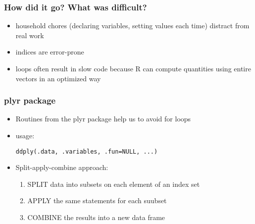 \documentclass{beamer}\usepackage[]{graphicx}\usepackage[]{color}
\makeatletter
\newenvironment{kframe}{%
 \def\at@end@of@kframe{}%
 \ifinner\ifhmode%
  \def\at@end@of@kframe{\end{minipage}}%
  \begin{minipage}{\columnwidth}%
 \fi\fi%
 \def\FrameCommand##1{\hskip\@totalleftmargin \hskip-\fboxsep
 \colorbox{shadecolor}{##1}\hskip-\fboxsep
     \hskip-\linewidth \hskip-\@totalleftmargin \hskip\columnwidth}%
 \MakeFramed {\advance\hsize-\width
   \@totalleftmargin\z@ \linewidth\hsize
   \@setminipage}}%
 {\par\unskip\endMakeFramed%
 \at@end@of@kframe}
\newenvironment{knitrout}{}{} %
\makeatother
\begin{document}
\begin{frame}[fragile]
\frametitle{How did it go? What was difficult?}
\begin{itemize}
\item household chores (declaring variables, setting values each time) distract from real work\bigskip\bigskip
\item indices are error-prone\bigskip\bigskip
\item loops often result in slow code because R can compute quantities using entire vectors in an optimized way
\end{itemize}
\end{frame}

\begin{frame}[fragile]
\frametitle{plyr package}
\begin{itemize}
\item Routines from the plyr package help us to avoid for loops\bigskip
\item usage:
\begin{knitrout}\scriptsize
{}\color{fgcolor}\begin{kframe}
\begin{verbatim}
ddply(.data, .variables, .fun=NULL, ...)
\end{verbatim}
\end{kframe}
\end{knitrout}
\bigskip
\item Split-apply-combine approach:
\begin{enumerate}
\item SPLIT data into subsets on each element of an index set
\item APPLY the same statements for each suubset
\item COMBINE the results into a new data frame
\end{enumerate}
\end{itemize}
\end{frame}
\end{document}
